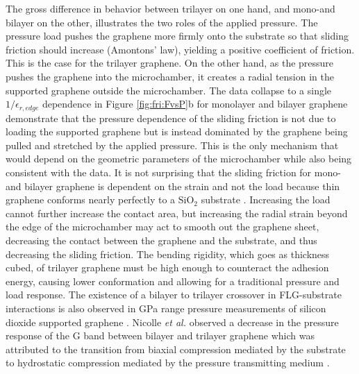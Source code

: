 The gross difference in behavior between trilayer on one hand, and mono-and bilayer on the other, illustrates the two roles of the applied pressure.
The pressure load pushes the graphene more firmly onto the substrate so that sliding friction should increase (Amontons' law), yielding a positive coefficient of friction.
This is the case for the trilayer graphene.
On the other hand, as the pressure pushes the graphene into the microchamber, it creates a radial tension in the supported graphene outside the microchamber.
The data collapse to a single $1/\epsilon_{r,edge}$ dependence in Figure \ref{fig:fri:FvsP}b for monolayer and bilayer graphene demonstrate that the pressure dependence of the sliding friction is not due to loading the supported graphene but is instead dominated by the graphene being pulled and stretched by the applied pressure.
This is the only mechanism that would depend on the geometric parameters of the microchamber while also being consistent with the data.
It is not surprising that the sliding friction for mono- and bilayer graphene is dependent on the strain and not the load because thin graphene conforms nearly perfectly to a $\mathrm{SiO_2}$ substrate \cite{Stolyarova2007,Lui2009,Cullen2010}.
Increasing the load cannot further increase the contact area, but increasing the radial strain beyond the edge of the microchamber may act to smooth out the graphene sheet, decreasing the contact between the graphene and the substrate, and thus decreasing the sliding friction.
The bending rigidity, which goes as thickness cubed, of trilayer graphene must be high enough to counteract the adhesion energy, causing lower conformation and allowing for a traditional pressure and load response.
The existence of a bilayer to trilayer crossover in FLG-substrate interactions is also observed in GPa range pressure measurements of silicon dioxide supported graphene \cite{Proctor2009,Nicolle2011}.
Nicolle \textit{et al.} observed a decrease in the pressure response of the G band between bilayer and trilayer graphene which was attributed to the transition from biaxial compression mediated by the substrate to hydrostatic compression mediated by the pressure transmitting medium \cite{Nicolle2011}.

